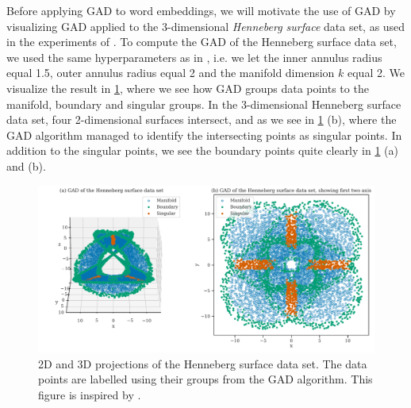 Before applying GAD to word embeddings, we will motivate the use of GAD by visualizing GAD applied to the 3-dimensional \textit{Henneberg surface} data set, as used in the experiments of \cite{stolz2020geometric}. To compute the GAD of the Henneberg surface data set, we used the same hyperparameters as in \cite{stolz2020geometric}, i.e. we let the inner annulus radius equal 1.5, outer annulus radius equal 2 and the manifold dimension $k$ equal 2. We visualize the result in \cref{fig:gad-henneberg-3d}, where we see how GAD groups data points to the manifold, boundary and singular groups. In the 3-dimensional Henneberg surface data set, four 2-dimensional surfaces intersect, and as we see in \cref{fig:gad-henneberg-3d} (b), where the GAD algorithm managed to identify the intersecting points as singular points. In addition to the singular points, we see the boundary points quite clearly in \cref{fig:gad-henneberg-3d} (a) and (b).
\begin{figure}[H]
    \centering
    \includegraphics[width=\textwidth]{thesis/figures/gad-henneberg-3d.pdf}
    \caption{2D and 3D projections of the Henneberg surface data set. The data points are labelled using their groups from the GAD algorithm. This figure is inspired by \cite[Figure 3]{stolz2020geometric}.}
    \label{fig:gad-henneberg-3d}
\end{figure}

